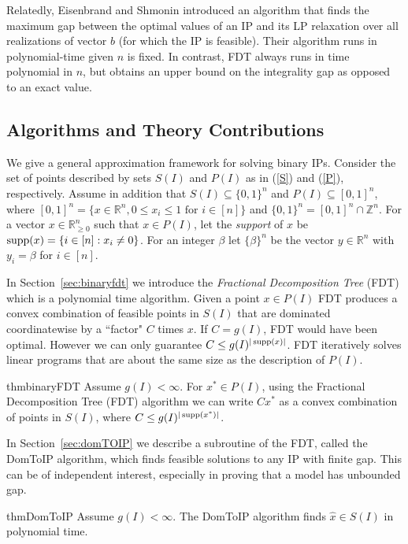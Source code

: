 Relatedly, Eisenbrand and Shmonin \cite{eisenbrand} introduced an algorithm that finds the maximum gap between the optimal values of an IP and its LP relaxation over all realizations of vector $b$ (for which the IP is feasible). Their algorithm runs in polynomial-time given $n$ is fixed. In contrast, FDT always runs in time polynomial in $n$, but obtains an upper bound on the integrality gap as opposed to an exact value.



\subsection{Algorithms and Theory Contributions} 
 
We give a general approximation framework for solving binary IPs.
Consider the set of points described by sets $S(I)$ and $P(I)$ as in (\ref{S}) and (\ref{P}), respectively. Assume in addition that $S(I)\subseteq  \{0,1\}^n$ and $P(I)\subseteq [0,1]^n$, where $[0,1]^n = \{x\in \mathbb{R}^n, 0\leq x_i\leq 1 \mbox{ for } i\in[n]\}$ and $\{0,1\}^n = [0,1]^n \cap \mathbb{Z}^n$.
For a vector $x\in \mathbb{R}_{\geq 0}^n$ such that $x\in P(I)$, let the {\em support} of $x$ be $\operatorname{supp}(x)= \{i \in [n]: x_i \neq 0\}$. For an integer $\beta$ let $\{\beta\}^n$ be the vector $y\in \mathbb{R}^n$ with $y_i=\beta$ for $i\in [n]$.


In Section~\ref{sec:binaryfdt} we introduce the \textit{Fractional Decomposition Tree} (FDT) which is a polynomial time algorithm. Given a point $x\in P(I)$ FDT produces a convex combination of feasible points in $S(I)$ that are dominated coordinatewise by a ``factor" $C$ times $x$.
If $C = g(I)$, FDT would have been optimal. However we can only guarantee $C\leq g(I)^{|\operatorname{supp}(x)|}$. FDT iteratively solves linear programs that are about the same size as the description of $P(I)$.

\begin{restatable}{thm}{binaryFDT}
	\label{binaryFDT}
	Assume $g(I) 	<\infty$. For $x^*\in P(I)$, using 	the Fractional Decomposition Tree (FDT) algorithm we can write $Cx^*$ as a convex combination of points in $S(I)$, where $C\leq g(I)^{|\operatorname{supp}(x^*)|}$.
\end{restatable}

In Section~\ref{sec:domTOIP} we describe a subroutine of the FDT, called the DomToIP algorithm, which finds feasible solutions to any IP with finite gap. This can be of independent interest, especially in proving that a model has unbounded gap.
\begin{restatable}{thm}{DomToIP}
	\label{domtoIP}
	Assume $g(I) < \infty$. The DomToIP algorithm finds $\hat{x}\in S(I)$ in polynomial time.
\end{restatable}

